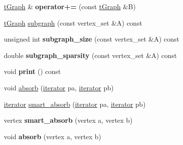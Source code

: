 \begin{DoxyCompactItemize}
\item 
\mbox{\label{class_n_graph_1_1t_graph_a329c3e80609a8bf3c2f6e00ab8298e3d}} 
\mbox{\hyperlink{class_n_graph_1_1t_graph}{t\+Graph}} \& {\bfseries operator+=} (const \mbox{\hyperlink{class_n_graph_1_1t_graph}{t\+Graph}} \&B)
\item 
\mbox{\hyperlink{class_n_graph_1_1t_graph}{t\+Graph}} \mbox{\hyperlink{class_n_graph_1_1t_graph_ab685e653704db79f06216d0d5977f153}{subgraph}} (const vertex\+\_\+set \&A) const
\item 
\mbox{\label{class_n_graph_1_1t_graph_ae8f6d218e22f2271aab306e10c252201}} 
unsigned int {\bfseries subgraph\+\_\+size} (const vertex\+\_\+set \&A) const
\item 
\mbox{\label{class_n_graph_1_1t_graph_a99c4a072f1445173ca8f36b711f60954}} 
double {\bfseries subgraph\+\_\+sparsity} (const vertex\+\_\+set \&A) const
\item 
\mbox{\label{class_n_graph_1_1t_graph_aa9a8cb7d229675823a308ab361b849e2}} 
void {\bfseries print} () const
\item 
void \mbox{\hyperlink{class_n_graph_1_1t_graph_a1844ff9c48370c79147c84384f400c80}{absorb}} (\mbox{\hyperlink{class_n_graph_1_1t_graph_a6e446a33b74e5c0c39fb6c50a4f07cec}{iterator}} pa, \mbox{\hyperlink{class_n_graph_1_1t_graph_a6e446a33b74e5c0c39fb6c50a4f07cec}{iterator}} pb)
\item 
\mbox{\hyperlink{class_n_graph_1_1t_graph_a6e446a33b74e5c0c39fb6c50a4f07cec}{iterator}} \mbox{\hyperlink{class_n_graph_1_1t_graph_aa3752935ebcd6e4688b52cd0f6d1211f}{smart\+\_\+absorb}} (\mbox{\hyperlink{class_n_graph_1_1t_graph_a6e446a33b74e5c0c39fb6c50a4f07cec}{iterator}} pa, \mbox{\hyperlink{class_n_graph_1_1t_graph_a6e446a33b74e5c0c39fb6c50a4f07cec}{iterator}} pb)
\item 
\mbox{\label{class_n_graph_1_1t_graph_a35015ce8e51b4301e69d542c21d26c46}} 
vertex {\bfseries smart\+\_\+absorb} (vertex a, vertex b)
\item 
\mbox{\label{class_n_graph_1_1t_graph_ace64fe566c1df5b77770b4f3ff9ceca0}} 
void {\bfseries absorb} (vertex a, vertex b)
\end{DoxyCompactItemize}
